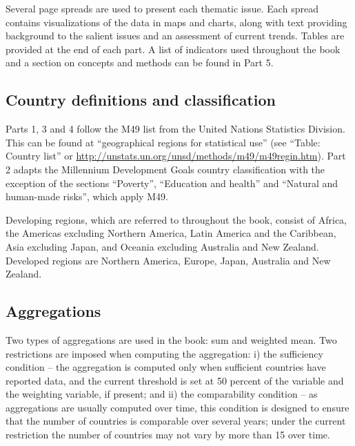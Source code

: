Several page spreads are used to present each thematic issue. Each spread contains visualizations of the data in maps and charts, along with text providing background to the salient issues and an assessment of current trends. Tables are provided at the end of each part. A list of indicators used throughout the book and a section on concepts and methods can be found in Part 5.



\subsection{Country definitions and classification}

Parts 1, 3 and 4 follow the M49 list from the United Nations Statistics Division. This can be found at  “geographical regions for statistical use” (see “Table: Country list” or \url{http://unstats.un.org/unsd/methods/m49/m49regin.htm}). Part 2 adapts the Millennium Development Goals country classification with the exception of the sections “Poverty”, “Education and health” and “Natural and human-made risks”, which apply M49. 

Developing regions, which are referred to throughout the book, consist of Africa, the Americas excluding Northern America, Latin America and the Caribbean, Asia excluding Japan, and Oceania excluding Australia and New Zealand. Developed regions are Northern America, Europe, Japan, Australia and New Zealand. 


\subsection{Aggregations}

Two types of aggregations are used in the book: sum and weighted mean. Two restrictions are imposed when computing the aggregation: i) the sufficiency condition – the aggregation is computed only when sufficient countries have reported data, and the current threshold is set at 50 percent of the variable and the weighting variable, if present; and ii) the comparability condition – as aggregations are usually computed over time, this condition is designed to ensure that the number of countries is comparable over several years; under the current restriction the number of countries may not vary by more than 15 over time.


